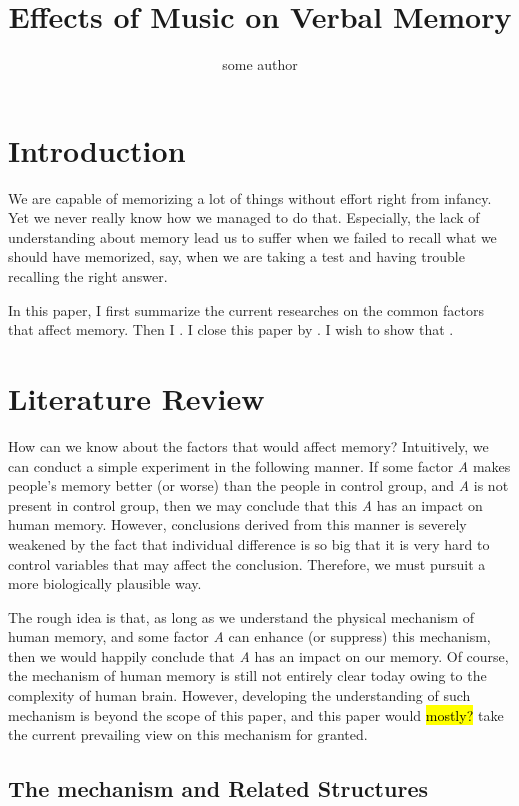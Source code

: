 \documentclass{article}
\title{Effects of Music on Verbal Memory}
\author{some author}
\begin{document}
\maketitle{}

\section{Introduction}

We are capable of memorizing a lot of things without effort right from infancy. Yet we never really know how we managed to do that. Especially, the lack of understanding about memory lead us to suffer when we failed to recall what we should have memorized, say, when we are taking a test and having trouble recalling the right answer. 

In this paper, I first summarize the current researches on the common factors that affect memory. Then I \hl{  }. I close this paper by \hl{  }. I wish to show that \hl{  }.

\section{Literature Review}

How can we know about the factors that would affect memory? Intuitively, we can conduct a simple experiment in the following manner. If some factor \textit{A} makes people's memory better (or worse) than the people in control group, and \textit{A} is not present in control group, then we may conclude that this \textit{A} has an impact on human memory. However, conclusions derived from this manner is severely weakened by the fact that individual difference is so big that it is very hard to control variables that may affect the conclusion. Therefore, we must pursuit a more biologically plausible way.

The rough idea is that, as long as we understand the physical mechanism of human memory, and some factor \textit{A} can enhance (or suppress) this mechanism, then we would happily conclude that \textit{A} has an impact on our memory. Of course, the mechanism of human memory is still not entirely clear today owing to the complexity of human brain. However, developing the understanding of such mechanism is beyond the scope of this paper, and this paper would \hl{mostly?} take the current prevailing view on this mechanism for granted.

\subsection{The mechanism and Related Structures}
\end{document}
